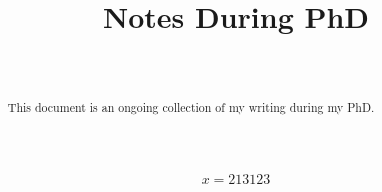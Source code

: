 \documentclass[aos,preprint]{imsart}
\numberwithin{equation}{section}
\begin{document}
\begin{frontmatter}
	\title{Notes During PhD}

	\begin{aug}
		\author[A]{~ }
		\address[A]{Centrum Wiskunde \& Informatica, Amsterdam, The Netherlands.}
	\end{aug}

\end{frontmatter}


\tableofcontents

\begin{abstract}
	\noindent
	This document is an ongoing collection of my writing during my PhD.
\end{abstract}

\begin{align}
	x = 213123
\end{align}
















\clearpage

\nocite{*}



\end{document}
